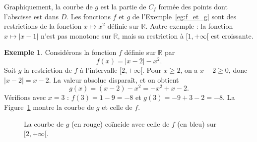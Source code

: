 \documentclass[12pt,a4paper]{article}
\theoremstyle{plain}
\theoremstyle{definition}
\newtheorem{example}[theorem]{Exemple}
\theoremstyle{remark}
\begin{document}
Graphiquement, la courbe de $g$ est la partie de $C_f$ formée des points dont
l'abscisse est dans $D$. Les fonctions $f$ et $g$ de l'Exemple~\ref{eg:f_et_g} sont
des restrictions de la fonction $x \mapsto x^2$ définie sur $\mathbb{R}$. Autre
exemple : la fonction $x \mapsto \lvert x - 1 \rvert$ n'est pas monotone sur
$\mathbb{R}$, mais sa restriction à $[1, +\infty[$ est croissante.

\begin{example}
  Considérons la fonction $f$ définie sur $\mathbb{R}$ par
  \[
  f(x) = \lvert x - 2 \rvert - x^2.
  \]
  Soit $g$ la restriction de $f$ à l'intervalle $[2, +\infty[$. Pour $x \ge 2$, on a
  $x - 2 \ge 0$, donc $\lvert x - 2 \rvert = x - 2$. La valeur absolue disparaît, et on obtient
  \[
  g(x) = (x - 2) - x^2 = -x^2 + x - 2.
  \]
  Vérifions avec $x = 3$ : $f(3) = 1 - 9 = -8$ et
  $g(3) = -9 + 3 - 2 = -8$. La Figure~\ref{fig:restriction} montre la courbe de $g$
  et celle de $f$.
\end{example}

\begin{figure}[ht]
  \centering
  \caption{La courbe de $g$ (en rouge) coïncide avec celle de $f$ (en bleu) sur $[2,+\infty[$.}
  \label{fig:restriction}
\end{figure}
\end{document}
